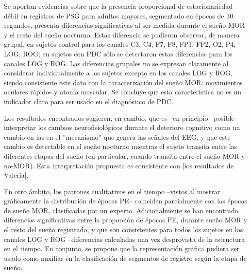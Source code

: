 Se aportan evidencias sobre que la presencia proporcional de estacionariedad d\'ebil en registros 
de PSG para adultos mayores, segmentado en \'epocas de 30 segundos, 
presenta diferencias significativas al ser medida durante el sue\~no MOR y el resto del sue\~no
nocturno. Estas diferencia se pudieron observar, de manera grupal, 
en sujetos control para los canales 
C3, C4, F7, F8, FP1, FP2, O2, P4, LOG, ROG; en sujetos con PDC s\'olo se detectaron estas 
diferencias para los canales LOG y ROG.
Las diferencias grupales no se expresan claramente al considerar individualmente
a los sujetos excepto en los canales LOG y ROG, siendo consistente este dato con la 
caracterizaci\'on del sue\~no MOR: movimientos oculares r\'apidos y aton\'ia muscular.
Se concluye que esta caracter\'istica no es un indicador claro para ser usado
en el diagn\'ostico de PDC.

Los resultados encontrados sugieren, en cambio, que es --en principio-- posible interpretar los
cambios neurofisiol\'ogicos durante el deterioro cognitivo como un cambio en las 
en el ''mecanismo'' que genera las se\~nales del EEG, y que este cambio es detectable en el 
sue\~no nocturno mientras el sujeto transita entre las diferentes etapas del sue\~no 
(en particular, cuando transita entre el sue\~no MOR y no-MOR).
Esta interpretaci\'on propuesta es consistente con [los resultados de Valeria].

En otro \'ambito, los
patrones cualitativos en el tiempo --vistos al
mostrar gr\'aficamente la distribuci\'on de \'epocas PE-- coinciden parcialmente con las \'epocas
de sue\~no MOR, clasificadas por un experto.
Adicionalmente se han encontrado diferencias significativas entre la proporci\'on de \'epocas PE,
durante sue\~no MOR y el resto del sue\~no registrado, y que son consistentes para todos los
sujetos en los canales LOG y ROG --diferencias calculadas una vez desprovista de la estructura
en el tiempo. En conjunto, se propone que la representaci\'on gr\'afica pudiera ser usado
como auxiliar en la clasificaci\'on de segmentos de registro seg\'un la etapa de sue\~no.

